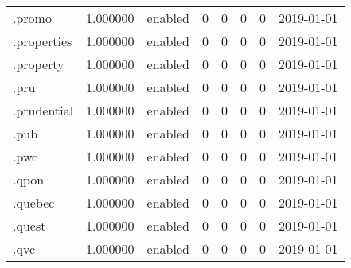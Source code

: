 \begin{tabular}{lrlrrrrl}
.promo                    &          1.000000 &         enabled &                           0 &                           0 &                           0 &                   0 &           2019-01-01 \\
.properties               &          1.000000 &         enabled &                           0 &                           0 &                           0 &                   0 &           2019-01-01 \\
.property                 &          1.000000 &         enabled &                           0 &                           0 &                           0 &                   0 &           2019-01-01 \\
.pru                      &          1.000000 &         enabled &                           0 &                           0 &                           0 &                   0 &           2019-01-01 \\
.prudential               &          1.000000 &         enabled &                           0 &                           0 &                           0 &                   0 &           2019-01-01 \\
.pub                      &          1.000000 &         enabled &                           0 &                           0 &                           0 &                   0 &           2019-01-01 \\
.pwc                      &          1.000000 &         enabled &                           0 &                           0 &                           0 &                   0 &           2019-01-01 \\
.qpon                     &          1.000000 &         enabled &                           0 &                           0 &                           0 &                   0 &           2019-01-01 \\
.quebec                   &          1.000000 &         enabled &                           0 &                           0 &                           0 &                   0 &           2019-01-01 \\
.quest                    &          1.000000 &         enabled &                           0 &                           0 &                           0 &                   0 &           2019-01-01 \\
.qvc                      &          1.000000 &         enabled &                           0 &                           0 &                           0 &                   0 &           2019-01-01 \\

\end{tabular}
